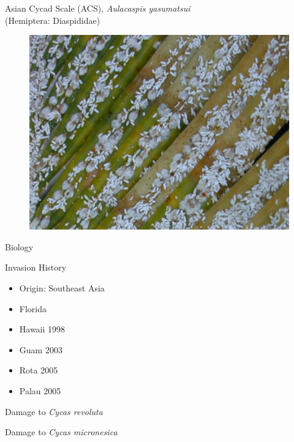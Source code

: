 \documentclass[]{beamer}
\begin{document}
\begin{frame}{Asian Cycad Scale (ACS), \textit{Aulacaspis yasumatsui}\\(Hemiptera: Diaspididae)}
	\begin{figure}
		\includegraphics[height=0.7\textheight]{asian-cycad-scale/output-07.png}
	\end{figure}
\end{frame}


\begin{frame}{Biology}
\end{frame}

\begin{frame}{Invasion History}
	\begin{itemize}
		\item Origin: Southeast Asia
		\item Florida
		\item Hawaii 1998
		\item Guam 2003
		\item Rota 2005
		\item Palau 2005
	\end{itemize}
\end{frame}

\begin{frame}{Damage to \textit{Cycas revoluta}}
\end{frame}

\begin{frame}{Damage to \textit{Cycas micronesica}}
\end{frame}
\end{document}
